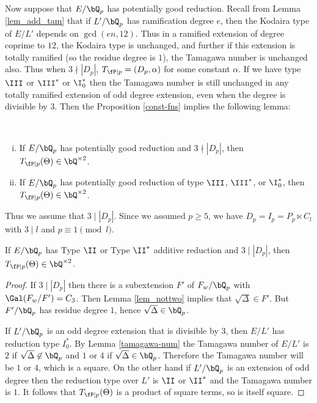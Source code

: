 Now suppose that $E / \bQ_p$ has potentially good reduction. Recall from Lemma \ref{lem_add_tam} that if $L' / \bQ_p$ has ramification degree $e$, then the Kodaira type of $E / L'$ depends on $\gcd(e n, 12)$. Thus in a ramified extension of degree coprime to $12$, the Kodaira type is unchanged, and further if this extension is totally ramified (so the residue degree is $1$), the Tamagawa number is unchanged also. Thus when $3 \nmid |D_p|$, $T_{\fP \mid p} = (D_p, \alpha)$ for some constant $\alpha$. If we have type $\III$ or $\III^*$ or $\I_0^*$ then the Tamagawa number is still unchanged in any totally ramified extension of odd degree extension, even when the degree is divisible by $3$. Then the Proposition \ref{const-fns} implies the following lemma:

\begin{lemma}
    \
    \begin{enumerate}[(i)]
        \setlength\itemsep{0em}
        \item If $E / \bQ_p$ has potentially good reduction and $3 \nmid |D_p|$, then $T_{\fP \mid p}(\Theta) \in \bQ^{\times 2}$.
        \item If $E / \bQ_p$ has potentially good reduction of type $\III$, $\III^*$, or $\I_0^*$, then $T_{\fP \mid p}(\Theta) \in \bQ^{\times 2}$.
    \end{enumerate}
\end{lemma}

Thus we assume that $3 \mid |D_p|$. Since we assumed $p \geq 5$, we have $D_p = I_p = P_p \ltimes C_l$ with $3 \mid l$ and $p \equiv 1 \pmod l$.

\begin{lemma}
If $E / \bQ_p$ has Type $\II$ or Type $\II^*$ additive reduction and $3 \mid |D_p|$, then $T_{\fP \mid p}(\Theta) \in \bQ^{\times 2}$. 
\end{lemma}

\begin{proof}
If $3 \mid |D_p|$ then there is a subextension $F'$ of $F_w / \bQ_p$ with $\Gal(F_w / F') = C_3$. Then Lemma \ref{lem_nottwo} implies that $\sqrt{\Delta} \in F'$. But $F' / \bQ_p$ has residue degree $1$, hence $\sqrt{\Delta} \in \bQ_p$. 

If $L' / \bQ_p$ is an odd degree extension that is divisible by $3$, then $E / L'$ has reduction type $I_0^*$. By Lemma \ref{tamagawa-num} the Tamagawa number of $E / L'$ is $2$ if $\sqrt{\Delta} \not\in \bQ_p$ and $1$ or $4$ if $\sqrt{\Delta} \in \bQ_p$. Therefore the Tamagawa number will be $1$ or $4$, which is a square.
On the other hand if $L' / \bQ_p$ is an extension of odd degree then the reduction type over $L'$ is $\II$ or $\II^*$ and the Tamagawa number is $1$. It follows that $T_{\fP \mid p}(\Theta)$ is a product of square terms, so is itself square.  
\end{proof} 

